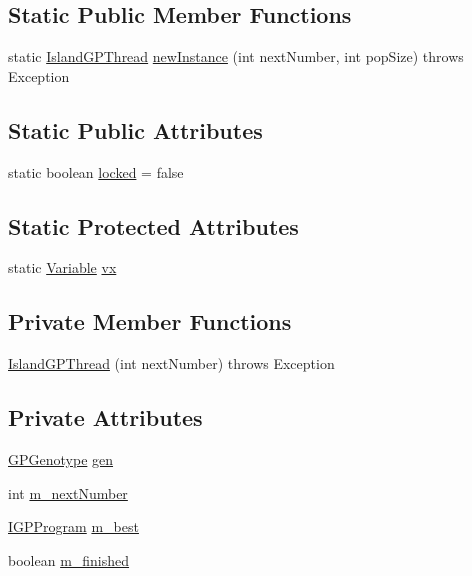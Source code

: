 \subsection*{Static Public Member Functions}
\begin{DoxyCompactItemize}
\item 
static \hyperlink{classexamples_1_1gp_1_1island_1_1_island_g_p_thread}{Island\-G\-P\-Thread} \hyperlink{classexamples_1_1gp_1_1island_1_1_island_g_p_thread_af9e432642775e2119193ed112b34676f}{new\-Instance} (int next\-Number, int pop\-Size)  throws Exception 
\end{DoxyCompactItemize}
\subsection*{Static Public Attributes}
\begin{DoxyCompactItemize}
\item 
static boolean \hyperlink{classexamples_1_1gp_1_1island_1_1_island_g_p_thread_a2a0e5fd08670cc094e538789f6e8b74f}{locked} = false
\end{DoxyCompactItemize}
\subsection*{Static Protected Attributes}
\begin{DoxyCompactItemize}
\item 
static \hyperlink{classorg_1_1jgap_1_1gp_1_1terminal_1_1_variable}{Variable} \hyperlink{classexamples_1_1gp_1_1island_1_1_island_g_p_thread_af169d491a3fa63979e3b6927b7d77976}{vx}
\end{DoxyCompactItemize}
\subsection*{Private Member Functions}
\begin{DoxyCompactItemize}
\item 
\hyperlink{classexamples_1_1gp_1_1island_1_1_island_g_p_thread_a03c69c634aa5cac9def0dbba07904d12}{Island\-G\-P\-Thread} (int next\-Number)  throws Exception 
\end{DoxyCompactItemize}
\subsection*{Private Attributes}
\begin{DoxyCompactItemize}
\item 
\hyperlink{classorg_1_1jgap_1_1gp_1_1impl_1_1_g_p_genotype}{G\-P\-Genotype} \hyperlink{classexamples_1_1gp_1_1island_1_1_island_g_p_thread_a74c645600933327ec755b13f54c6dc92}{gen}
\item 
int \hyperlink{classexamples_1_1gp_1_1island_1_1_island_g_p_thread_a4493a37a4f8ca6d7b85d4ae274269869}{m\-\_\-next\-Number}
\item 
\hyperlink{interfaceorg_1_1jgap_1_1gp_1_1_i_g_p_program}{I\-G\-P\-Program} \hyperlink{classexamples_1_1gp_1_1island_1_1_island_g_p_thread_ad1b4d61ee4fd926f650df84b771939f7}{m\-\_\-best}
\item 
boolean \hyperlink{classexamples_1_1gp_1_1island_1_1_island_g_p_thread_a179aa1254667d3832d28b0593f29287d}{m\-\_\-finished}
\end{DoxyCompactItemize}
